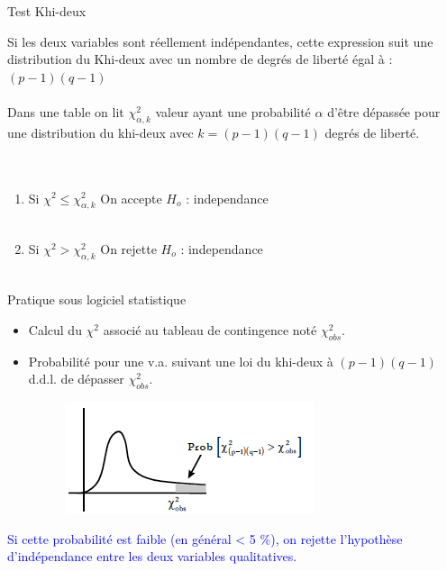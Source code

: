 \documentclass[11pt]{beamer}
\begin{document}
\begin{frame}{Test Khi-deux}

Si les deux variables sont réellement indépendantes, cette expression suit une distribution du Khi-deux avec un nombre de degrés de liberté égal
à : $(p -1) (q -1)$\\~\\

Dans une table on lit $\chi_{\alpha,k}^2$ valeur ayant une probabilité
$\alpha$ d’être dépassée pour une distribution du khi-deux avec $k = (p-1) (q -1)$ degrés de liberté.\\~\\~\\

\begin{enumerate}

\item Si $\chi^2\leq \chi_{\alpha,k}^2$  On accepte $H_o$ : independance \\~\\

\item  Si $\chi^2 > \chi_{\alpha,k}^2$  On rejette $H_o$ : independance \\~\\

\end{enumerate}

\end{frame}
\begin{frame}{Pratique sous logiciel statistique}

\begin{itemize}
\item  Calcul du $\chi^2$ associé au tableau de contingence noté $\chi^2_{obs}$.

\item Probabilité pour une v.a. suivant une loi du khi-deux à
$(p -1) (q -1)$ d.d.l. de dépasser $\chi^2_{obs}$.

\begin{figure}
\includegraphics[scale=0.8]{exemple7.png}  
\end{figure}

\end{itemize}


\textcolor{blue}{Si cette probabilité est faible (en général < 5 \%), on rejette l’hypothèse d’indépendance entre les deux variables qualitatives.}

\end{frame}
\end{document}
